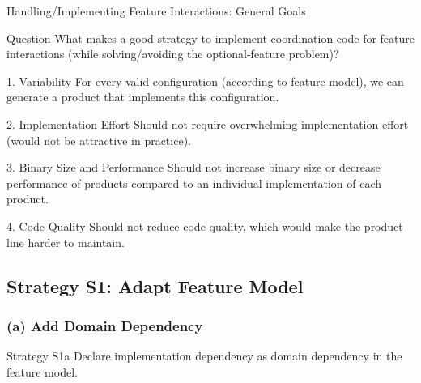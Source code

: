 \begin{frame}{Handling/Implementing Feature Interactions: General Goals}
	\begin{note}{Question}
		What makes a good strategy to implement coordination code for feature interactions (while solving/avoiding the optional-feature problem)?
	\end{note}
	\pause
	\begin{mycolumns}[animation=none]
		\begin{definition}{1. Variability}
			For every valid configuration (according to feature model), we can generate a product that implements this configuration.
		\end{definition}
		\pause
		\begin{definition}{2. Implementation Effort}
			Should not require overwhelming implementation effort (would not be attractive in practice).
		\end{definition}
		\pause
	\mynextcolumn
		\begin{definition}{3. Binary Size and Performance}
			Should not increase binary size or decrease performance of products compared to an individual implementation of each product.
		\end{definition}
		\pause
		\begin{definition}{4. Code Quality}
			Should not reduce code quality, which would make the product line harder to maintain. 
		\end{definition}
	\end{mycolumns}
\end{frame}

\subsection{Strategy S1: Adapt Feature Model}

\subsubsection*{(a) Add Domain Dependency}
\begin{frame}{\myframetitle}
	\begin{mycolumns}[widths={30},animation=none]
		\begin{definition}{Strategy S1a}
			Declare implementation dependency as domain dependency in the feature model.
		\end{definition}
	\mynextcolumn
	\end{mycolumns}
\end{frame}

